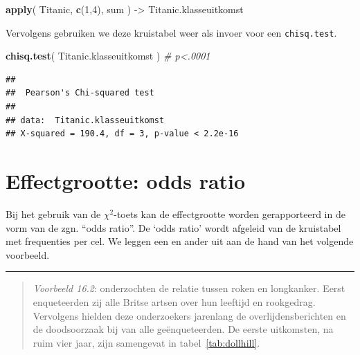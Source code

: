 \documentclass[
]{book}
\newenvironment{Shaded}{\begin{snugshade}}{\end{snugshade}}
\newcommand{\CommentTok}[1]{\textcolor[rgb]{0.56,0.35,0.01}{\textit{#1}}}
\newcommand{\DecValTok}[1]{\textcolor[rgb]{0.00,0.00,0.81}{#1}}
\newcommand{\KeywordTok}[1]{\textcolor[rgb]{0.13,0.29,0.53}{\textbf{#1}}}
\newcommand{\NormalTok}[1]{#1}
\newcommand{\StringTok}[1]{\textcolor[rgb]{0.31,0.60,0.02}{#1}}
\begin{document}
\begin{Shaded}
\begin{Highlighting}[]
\KeywordTok{apply}\NormalTok{( Titanic, }\KeywordTok{c}\NormalTok{(}\DecValTok{1}\NormalTok{,}\DecValTok{4}\NormalTok{), sum ) {-}\textgreater{}}\StringTok{ }\NormalTok{Titanic.klasseuitkomst}
\end{Highlighting}
\end{Shaded}

Vervolgens gebruiken we deze kruistabel weer als invoer voor een \texttt{chisq.test}.

\begin{Shaded}
\begin{Highlighting}[]
\KeywordTok{chisq.test}\NormalTok{( Titanic.klasseuitkomst )  }\CommentTok{\# p\textless{}.0001}
\end{Highlighting}
\end{Shaded}

\begin{verbatim}
## 
##  Pearson's Chi-squared test
## 
## data:  Titanic.klasseuitkomst
## X-squared = 190.4, df = 3, p-value < 2.2e-16
\end{verbatim}

\hypertarget{effectgrootte-odds-ratio}{%
\section{Effectgrootte: odds ratio}\label{effectgrootte-odds-ratio}}

Bij het gebruik van de \(\chi^2\)-toets kan de effectgrootte worden gerapporteerd in de
vorm van de zgn. ``odds ratio''. De `odds ratio' wordt afgeleid van de
kruistabel met frequenties per cel. We leggen een en ander uit aan de
hand van het volgende voorbeeld.

\begin{center}\rule{0.5\linewidth}{0.5pt}\end{center}

\begin{quote}
\emph{Voorbeeld 16.2}:
\citet{DollHill1956} onderzochten de relatie tussen roken en
longkanker. Eerst enqueteerden zij alle Britse artsen over hun leeftijd
en rookgedrag. Vervolgens hielden deze onderzoekers jarenlang de
overlijdensberichten en de doodsoorzaak bij van alle geënqueteerden. De
eerste uitkomsten, na ruim vier jaar, zijn samengevat in
tabel~\ref{tab:dollhill}.
\end{quote}
\end{document}
